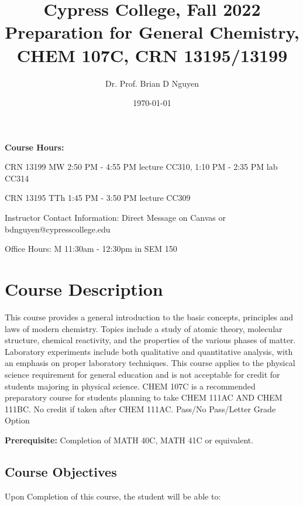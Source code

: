 \documentclass[11pt]{article}
\title{\textbf{Cypress College, Fall 2022 \\
    Preparation for General Chemistry, CHEM 107C, CRN 13195/13199}}
\author{Dr. Prof. Brian D Nguyen}
\date{\today}
\begin{document}
\maketitle 

\textbf{Course Hours:}

CRN 13199 MW 2:50 PM - 4:55 PM lecture CC310, 1:10 PM - 2:35 PM lab CC314

CRN 13195 TTh 1:45 PM - 3:50 PM lecture CC309

Instructor Contact Information: Direct Message on Canvas or bdnguyen@cypresscollege.edu

Office Hours: M 11:30am - 12:30pm in SEM 150

\section{Course Description}
This course provides a general introduction to the basic concepts, principles and laws
of modern chemistry. Topics include a study of atomic theory, molecular structure,
chemical reactivity, and the properties of the various phases of matter. Laboratory
experiments include both qualitative and quantitative analysis, with an emphasis on
proper laboratory techniques. This course applies to the physical science requirement
for general education and is not acceptable for credit for students majoring in physical
science. CHEM 107C is a recommended preparatory course for students planning to take
CHEM 111AC AND CHEM 111BC. No credit if taken after CHEM 111AC. Pass/No Pass/Letter
Grade Option

\textbf{Prerequisite:}  Completion of MATH 40C, MATH 41C or equivalent.

\subsection{Course Objectives}
Upon Completion of this course, the student will be able to:
\end{document}
